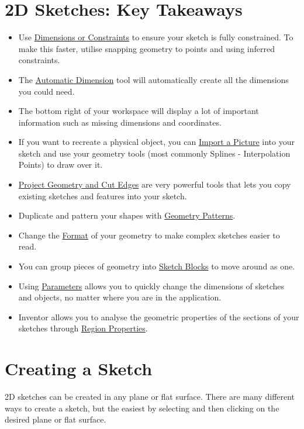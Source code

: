 \section{2D Sketches: Key Takeaways}
\begin{itemize}
\easydifficulty
\item Use \hyperref[chap:constraints]{Dimensions or Constraints} to ensure your sketch is fully constrained. To make this faster, utilise snapping geometry to points and using inferred constraints.
\item The \hyperref[subsec:auto-dim]{Automatic Dimension} tool will automatically create all the dimensions you could need.
\item The bottom right of your workspace will display a lot of important information such as missing dimensions and coordinates.
\item If you want to recreate a physical object, you can \hyperref[section:insert]{Import a Picture} into your sketch and use your geometry tools (most commonly Splines - Interpolation Points) to draw over it.
\item \hyperref[subsec:proj]{Project Geometry and Cut Edges} are very powerful tools that lets you copy existing sketches and features into your sketch.
\item Duplicate and pattern your shapes with \hyperref[section:geom-pattern]{Geometry Patterns}.
\item Change the \hyperref[section:format]{Format} of your geometry to make complex sketches easier to read.
\item You can group pieces of geometry into \hyperref[subsec:sketch-block]{Sketch Blocks} to move around as one.
\item Using \hyperref[section:param]{Parameters} allows you to quickly change the dimensions of sketches and objects, no matter where you are in the application.
\item Inventor allows you to analyse the geometric properties of the sections of your sketches through \hyperref[section:aux]{Region Properties}.
\cbend
\end{itemize}

\section{Creating a Sketch}

2D sketches can be created in any plane or flat surface. There are many different ways to create a sketch, but the easiest by selecting  and then clicking on the desired plane or flat surface.
